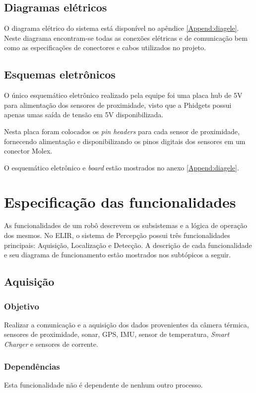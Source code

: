 \subsection{Diagramas elétricos}
\label{sec:diage}
O diagrama elétrico do sistema está disponível no apêndice \ref{Append:diagele}. Neste diagrama encontram-se todas as conexões elétricas e de comunicação bem como as especificações de conectores e cabos utilizados no projeto.


\subsection{Esquemas eletrônicos}
\label{ssec:esqe}
O único esquemático eletrônico realizado pela equipe foi uma placa hub de 5V para alimentação dos sensores de proximidade, visto que a Phidgets possui apenas umas saída de tensão em 5V disponibilizada.

 Nesta placa foram colocados os \textit{pin headers} para cada sensor de proximidade, fornecendo alimentação e disponibilizando os pinos digitais dos sensores em um conector Molex.

O esquemático eletrônico e \textit{board} estão mostrados no anexo \ref{Append:diagele}.


\section{Especificação das funcionalidades}
\label{sec:espf}

As funcionalidades de um robô descrevem os subsistemas e a lógica de operação dos mesmos. No ELIR, o sistema de Percepção possui três funcionalidades principais: Aquisição, Localização e Detecção. A descrição de cada funcionalidade e seu diagrama de funcionamento estão mostrados nos subtópicos a seguir. 

\subsection{Aquisição}
\label{ssec:func1}
\subsubsection{Objetivo}
Realizar a comunicação e a aquisição dos dados provenientes da câmera térmica, sensores de proximidade, sonar, GPS, IMU, sensor de temperatura, \textit{Smart Charger} e sensores de corrente.

\subsubsection{Dependências}
Esta funcionalidade não é dependente de nenhum outro processo.

